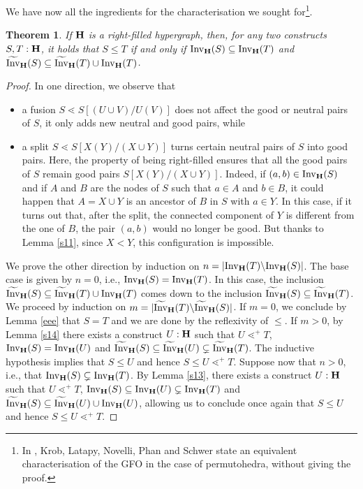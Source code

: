 \documentclass{article}
\theoremstyle{plain}
\newtheorem{theorem}[thm]{Theorem}
\theoremstyle{definition}
\newcommand{\Invt}{\widetilde{\mathrm{Inv}}}
\newcommand{\Inv}{{\mathrm{Inv}}}
\begin{document}
 
We have now all the ingredients for the characterisation we sought for\footnote{In \cite{KLNPS}, Krob, Latapy, Novelli, Phan and Schwer state an equivalent characterisation of the GFO in the case of permutohedra, without giving the proof.}.
 \begin{theorem}\label{gfo-inv}
If ${\bf H}$ is a right-filled hypergraph, then, for any two constructs $S,T:{\bf H}$, it holds that $S\leq T$ if and only if $\Inv_{\bf H}(S)\subseteq \Inv_{\bf H}(T)$ and $\Invt_{\bf H}(S)\subseteq \Invt_{\bf H}(T)\cup \Inv_{\bf H}(T)$.
\end{theorem}
\begin{proof}
In one direction, we observe that 
\begin{itemize}
\item a fusion $S\lessdot S[(U\cup V)/U(V)]$ does not affect the good or neutral pairs of $S$, it only adds new neutral and good pairs, while
\item a split $S\lessdot S[X(Y)/(X\cup Y)]$ turns certain neutral pairs of $S$ into good pairs. Here, the property of being right-filled ensures that all the good pairs of $S$ remain good pairs $S[X(Y)/(X\cup Y)]$. Indeed, if $(a,b)\in \Inv_{\bf H}(S)$ and if $A$ and $B$ are the nodes of $S$ such that $a\in A$ and $b\in B$, it could happen that $A=X\cup Y$ is an ancestor of $B$ in $S$ with $a\in Y$. In this case, if it turns out that, after the split, the connected component of $Y$ is different from the one of $B$, the pair $(a,b)$ would no longer be good. But thanks to Lemma \ref{s11}, since $X<Y$, this configuration is impossible.
 \end{itemize}

We prove the other direction by induction on $n=|\Inv_{\bf H}(T)\backslash \Inv_{\bf H}(S)|$. The base case is given by $n=0$, i.e., $\Inv_{\bf H}(S)= \Inv_{\bf H}(T)$. In this case, the inclusion $\Invt_{\bf H}(S)\subseteq \Invt_{\bf H}(T)\cup \Inv_{\bf H}(T)$ comes down to the inclusion $\Invt_{\bf H}(S)\subseteq \Invt_{\bf H}(T)$. We proceed by induction on $m=|\Invt_{\bf H}(T)\backslash \Invt_{\bf H}(S)|$. If $m=0$, we conclude by Lemma \ref{eee} that $S=T$ and we are done by the reflexivity of $\leq$. If $m>0$, by Lemma \ref{s14} there exists a construct $U:{\bf H}$ such that $U\lessdot^+ T$, $\Inv_{\bf H}(S)= \Inv_{\bf H}(U)$ and $\Invt_{\bf H}(S)\subseteq \Invt_{\bf H}(U)\subsetneq \Invt_{\bf H}(T)$. The inductive hypothesis implies that $S\leq U$ and hence $S\leq U\lessdot^+T$. Suppose now that $n>0$, i.e., that $\Inv_{\bf H}(S)\subsetneq \Inv_{\bf H}(T)$. By Lemma \ref{s13}, there exists a construct $U:{\bf H}$ such that $U\lessdot^+ T$, $\Inv_{\bf H}(S)\subseteq \Inv_{\bf H}(U)\subsetneq \Inv_{\bf H}(T)$ and $\Invt_{\bf H}(S)\subseteq \Invt_{\bf H}(U)\cup \Inv_{\bf H}(U)$, allowing us to conclude once again that $S\leq U$ and hence $S\leq U\lessdot^+ T$. 
\end{proof}
 
\end{document}
